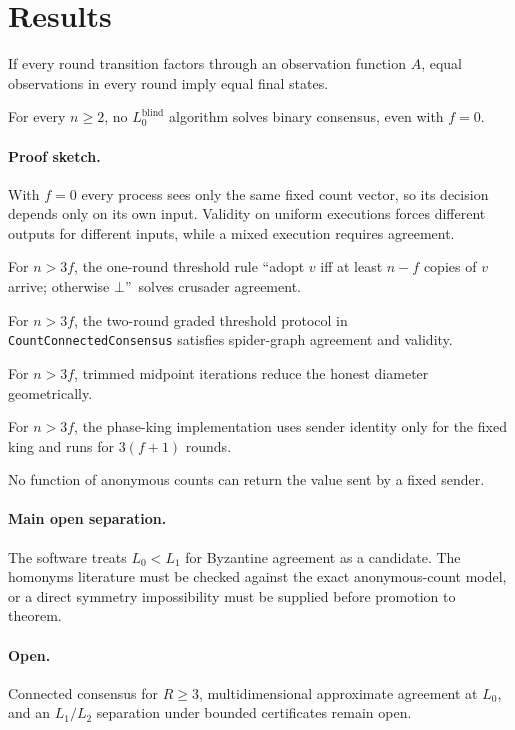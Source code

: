 \section{Results}\label{sec:results}
\begin{theorem}
If every round transition factors through an observation function $A$, equal observations in every round imply equal final states.
\end{theorem}
\begin{theorem}
For every $n\ge2$, no $L_0^{\mathrm{blind}}$ algorithm solves binary consensus, even with $f=0$.
\end{theorem}
\paragraph{Proof sketch.} With $f=0$ every process sees only the same fixed count vector, so its decision depends only on its own input. Validity on uniform executions forces different outputs for different inputs, while a mixed execution requires agreement.
\begin{theorem}
For $n>3f$, the one-round threshold rule \textquotedblleft adopt $v$ iff at least $n-f$ copies of $v$ arrive; otherwise $\bot$\textquotedblright\ solves crusader agreement.
\end{theorem}
\begin{theorem}[Connected consensus $R=2$ at $L_0$]
For $n>3f$, the two-round graded threshold protocol in \texttt{CountConnectedConsensus} satisfies spider-graph agreement and validity.
\end{theorem}
\begin{theorem}
For $n>3f$, trimmed midpoint iterations reduce the honest diameter geometrically.
\end{theorem}
\begin{theorem}
For $n>3f$, the phase-king implementation uses sender identity only for the fixed king and runs for $3(f+1)$ rounds.
\end{theorem}
\begin{lemma}
No function of anonymous counts can return the value sent by a fixed sender.
\end{lemma}
\paragraph{Main open separation.} The software treats $L_0<L_1$ for Byzantine agreement as a candidate. The homonyms literature must be checked against the exact anonymous-count model, or a direct symmetry impossibility must be supplied before promotion to theorem.
\paragraph{Open.} Connected consensus for $R\ge3$, multidimensional approximate agreement at $L_0$, and an $L_1/L_2$ separation under bounded certificates remain open.
